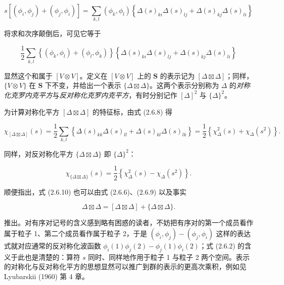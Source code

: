 \begin{equation*}
s\left[(\phi_{i}, \phi_{j}) + (\phi_{j}, \phi_{i})\right] = \sum_{k,l} (\phi_{k}, \phi_{l})\left\{\Delta(s)_{ki}\Delta(s)_{lj} + \Delta(s)_{kj}\Delta(s)_{li}\right\}
\tag{2.6.7}
\end{equation*}

将求和次序颠倒后，可见它等于

\begin{equation*}
\frac{1}{2}\sum_{k,l} \left\{(\phi_{k}, \phi_{l}) + (\phi_{l}, \phi_{k})\right\}\left\{\Delta(s)_{ki}\Delta(s)_{lj} + \Delta(s)_{kj}\Delta(s)_{li}\right\}
\tag{2.6.8}
\end{equation*}

显然这个和属于 $[V \otimes V]$。定义在 $[V \otimes V]$ 上的 $\mathbf{S}$ 的表示记为 $[\Delta \boxtimes \Delta]$；同样，$\{V \otimes V\}$ 在 $\mathbf{S}$ 下不变，并给出一个表示 $\{\Delta \boxtimes \Delta\}$。这两个表示分别称为 $\Delta$ 的\textit{对称化克罗内克平方}与\textit{反对称化克罗内克平方}，有时分别记作 $[\Delta]^{2}$ 与 $\{\Delta\}^{2}$。

为计算对称化平方 $[\Delta \boxtimes \Delta]$ 的特征标，由式 (2.6.8) 得

\begin{equation*}
\chi_{[\Delta \boxtimes \Delta]}(s) = \frac{1}{2}\sum_{k,l} \left\{\Delta(s)_{kk}\Delta(s)_{ll} + \Delta(s)_{kl}\Delta(s)_{lk}\right\} = \frac{1}{2}\left\{\chi_{\Delta}^{2}(s) + \chi_{\Delta}(s^{2})\right\}.
\tag{2.6.9}
\end{equation*}

同样，对反对称化平方 $\{\Delta \boxtimes \Delta\}$ 即 $\{\Delta\}^{2}$：

\begin{equation*}
\chi_{\{\Delta \boxtimes \Delta\}}(s) = \frac{1}{2}\left\{\chi_{\Delta}^{2}(s) - \chi_{\Delta}(s^{2})\right\}.
\tag{2.6.10}
\end{equation*}

顺便指出，式 (2.6.10) 也可以由式 (2.6.6)、(2.6.9) 以及事实

\begin{equation*}
\Delta \boxtimes \Delta = [\Delta \boxtimes \Delta] + \{\Delta \boxtimes \Delta\}.
\tag{2.6.11}
\end{equation*}

推出。对有序对记号的含义感到略有困惑的读者，不妨把有序对的第一个成员看作属于粒子 1、第二个成员看作属于粒子 2，于是 $(\phi_{i}, \phi_{j}) - (\phi_{j}, \phi_{i})$ 这样的表达式就对应通常的反对称化波函数 $\phi_{i}(1)\phi_{j}(2) - \phi_{j}(1)\phi_{i}(2)$；式 (2.6.2) 的含义于此也是清楚的：算符 $s$ 同时、同样地作用于粒子 1 与粒子 2 两个空间。表示的对称化与反对称化平方的思想显然可以推广到群的表示的更高次乘积，例如见 Lyubarskii (1960) 第 4 章。

